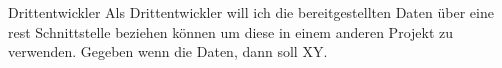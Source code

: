 \begin{scrumstory}[label=story:drittentwickler]{Drittentwickler}
	Als Drittentwickler will ich die bereitgestellten Daten über eine \gls{rest} Schnittstelle beziehen können um diese in einem anderen Projekt zu verwenden.
	\storyacceptance	
	Gegeben
	wenn die Daten, dann soll XY.
\end{scrumstory}
